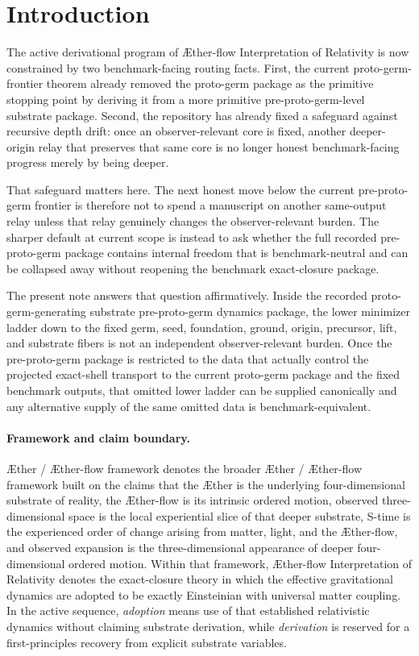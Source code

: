 \documentclass[11pt]{article}
\newcommand{\Aether}{\AE{}ther}
\newcommand{\Aflow}{\AE{}ther-flow}
\newcommand{\TheoryName}{\Aflow{} Interpretation of Relativity}
\newcommand{\TheoryProgram}{\Aether{} / \Aflow{} framework}
\begin{document}
\section{Introduction}

The active derivational program of \TheoryName{} is now constrained by two benchmark-facing routing facts. First, the current proto-germ-frontier theorem already removed the proto-germ package as the primitive stopping point by deriving it from a more primitive pre-proto-germ-level substrate package. Second, the repository has already fixed a safeguard against recursive depth drift: once an observer-relevant core is fixed, another deeper-origin relay that preserves that same core is no longer honest benchmark-facing progress merely by being deeper.

That safeguard matters here. The next honest move below the current pre-proto-germ frontier is therefore not to spend a manuscript on another same-output relay unless that relay genuinely changes the observer-relevant burden. The sharper default at current scope is instead to ask whether the full recorded pre-proto-germ package contains internal freedom that is benchmark-neutral and can be collapsed away without reopening the benchmark exact-closure package.

The present note answers that question affirmatively. Inside the recorded proto-germ-generating substrate pre-proto-germ dynamics package, the lower minimizer ladder down to the fixed germ, seed, foundation, ground, origin, precursor, lift, and substrate fibers is not an independent observer-relevant burden. Once the pre-proto-germ package is restricted to the data that actually control the projected exact-shell transport to the current proto-germ package and the fixed benchmark outputs, that omitted lower ladder can be supplied canonically and any alternative supply of the same omitted data is benchmark-equivalent.

\paragraph{Framework and claim boundary.}
\TheoryProgram{} denotes the broader \Aether{} / \Aflow{} framework built on the claims that the \Aether{} is the underlying four-dimensional substrate of reality, the \Aflow{} is its intrinsic ordered motion, observed three-dimensional space is the local experiential slice of that deeper substrate, S-time is the experienced order of change arising from matter, light, and the \Aflow{}, and observed expansion is the three-dimensional appearance of deeper four-dimensional ordered motion. Within that framework, \TheoryName{} denotes the exact-closure theory in which the effective gravitational dynamics are adopted to be exactly Einsteinian with universal matter coupling. In the active sequence, \emph{adoption} means use of that established relativistic dynamics without claiming substrate derivation, while \emph{derivation} is reserved for a first-principles recovery from explicit substrate variables.
\end{document}

